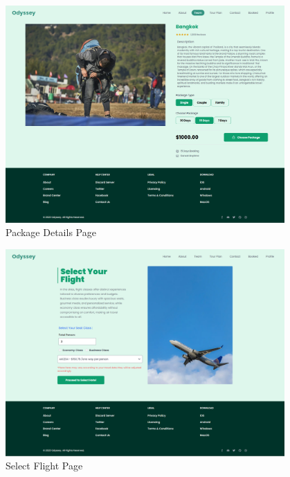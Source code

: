 \begin{figure}[H]
    \centering
    \includegraphics[width=0.95\textwidth]{./figures/frontend/4.png}
    \caption{Package Details Page}
    \label{fig:package_details}
\end{figure}

\begin{figure}[H]
    \centering
    \includegraphics[width=0.95\textwidth]{./figures/frontend/5.png}
    \caption{Select Flight Page}
    \label{fig:select_flight}
\end{figure}


